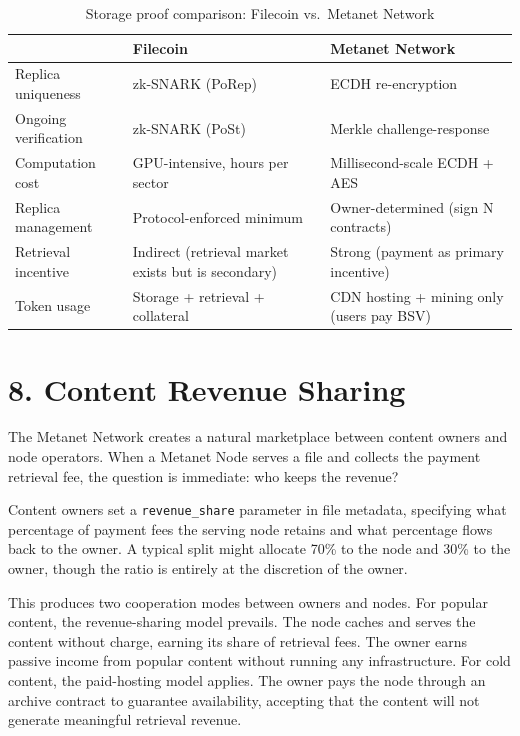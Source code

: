 \documentclass[11pt,a4paper]{article}
\begin{document}
\begin{table}[htbp]
\centering
\small
\begin{tabularx}{\textwidth}{@{}l >{\raggedright\arraybackslash}X >{\raggedright\arraybackslash}X@{}}
\toprule
 & \textbf{Filecoin} & \textbf{Metanet Network} \\
\midrule
Replica uniqueness & zk-SNARK (PoRep) & ECDH re-encryption \\
Ongoing verification & zk-SNARK (PoSt) & Merkle challenge-response \\
Computation cost & GPU-intensive, hours per sector & Millisecond-scale ECDH + AES \\
Replica management & Protocol-enforced minimum & Owner-determined (sign N contracts) \\
Retrieval incentive & Indirect (retrieval market exists but is secondary) & Strong (payment as primary incentive) \\
Token usage & Storage + retrieval + collateral & CDN hosting + mining only (users pay BSV) \\
\bottomrule
\end{tabularx}
\caption{Storage proof comparison: Filecoin vs.\ Metanet Network}
\end{table}

\section{8. Content Revenue Sharing}

The Metanet Network creates a natural marketplace between content owners and node operators. When a Metanet Node serves a file and collects the payment retrieval fee, the question is immediate: who keeps the revenue?

Content owners set a \texttt{revenue\_share} parameter in file metadata, specifying what percentage of payment fees the serving node retains and what percentage flows back to the owner. A typical split might allocate 70\% to the node and 30\% to the owner, though the ratio is entirely at the discretion of the owner.

This produces two cooperation modes between owners and nodes. For popular content, the revenue-sharing model prevails. The node caches and serves the content without charge, earning its share of retrieval fees. The owner earns passive income from popular content without running any infrastructure. For cold content, the paid-hosting model applies. The owner pays the node through an archive contract to guarantee availability, accepting that the content will not generate meaningful retrieval revenue.
\end{document}
